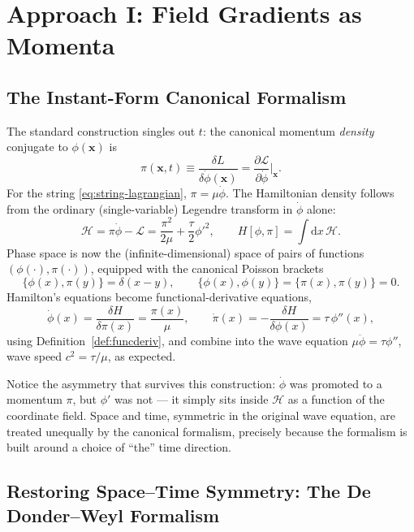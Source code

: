 \documentclass[11pt]{book}
\newcommand{\rd}{\mathrm{d}}
\newcommand{\pdv}[2]{\dfrac{\partial #1}{\partial #2}}
\newcommand{\fdv}[2]{\dfrac{\delta #1}{\delta #2}}
\newcommand{\Lag}{\mathcal{L}}
\newcommand{\Ham}{\mathcal{H}}
\theoremstyle{definition}
\theoremstyle{remark}
\begin{document}
\section{Approach I: Field Gradients as Momenta}
\label{sec:approach1}

\subsection{The Instant-Form Canonical Formalism}
\label{sec:canonical}

The standard construction singles out $t$: the canonical momentum \emph{density} conjugate to $\phi(\mathbf{x})$ is
\begin{equation}
\pi(\mathbf{x},t) \equiv \fdv{L}{\dot\phi(\mathbf{x})} = \pdv{\Lag}{\dot\phi}\bigg|_{\mathbf{x}}.
\end{equation}
For the string \eqref{eq:string-lagrangian}, $\pi = \mu\dot\phi$. The Hamiltonian density follows from the ordinary (single-variable) Legendre transform in $\dot\phi$ alone:
\begin{equation}
\Ham = \pi\dot\phi - \Lag = \frac{\pi^2}{2\mu} + \frac{\tau}{2}\phi'^2 ,
\qquad
H[\phi,\pi] = \int \rd x\, \Ham .
\end{equation}
Phase space is now the (infinite-dimensional) space of pairs of functions $(\phi(\cdot),\pi(\cdot))$, equipped with the canonical Poisson brackets
\begin{equation}
\{\phi(x),\pi(y)\} = \delta(x-y), \qquad \{\phi(x),\phi(y)\}=\{\pi(x),\pi(y)\}=0.
\label{eq:canonical-pb}
\end{equation}
Hamilton's equations become functional-derivative equations,
\begin{equation}
\dot\phi(x) = \fdv{H}{\pi(x)} = \frac{\pi(x)}{\mu}, \qquad
\dot\pi(x) = -\fdv{H}{\phi(x)} = \tau\,\phi''(x),
\end{equation}
using Definition~\ref{def:funcderiv}, and combine into the wave equation $\mu\ddot\phi=\tau\phi''$, wave speed $c^2=\tau/\mu$, as expected.

Notice the asymmetry that survives this construction: $\dot\phi$ was promoted to a momentum $\pi$, but $\phi'$ was not --- it simply sits inside $\Ham$ as a function of the coordinate field. Space and time, symmetric in the original wave equation, are treated unequally by the canonical formalism, precisely because the formalism is built around a choice of ``the'' time direction.

\subsection{Restoring Space--Time Symmetry: The De Donder--Weyl Formalism}
\label{sec:dw}
\end{document}
